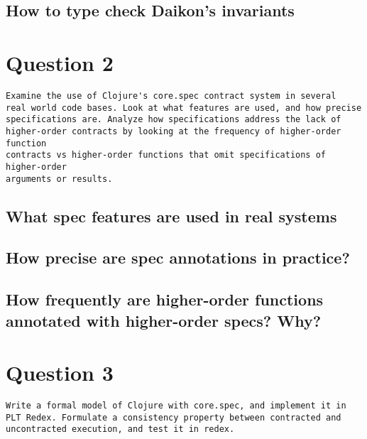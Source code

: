 \documentclass[10pt]{article}
\begin{document}
\subsection*{How to type check Daikon's invariants}


\section*{Question 2}

\begin{verbatim}
Examine the use of Clojure's core.spec contract system in several
real world code bases. Look at what features are used, and how precise
specifications are. Analyze how specifications address the lack of
higher-order contracts by looking at the frequency of higher-order function
contracts vs higher-order functions that omit specifications of higher-order
arguments or results.
\end{verbatim}

\subsection*{What spec features are used in real systems}

\subsection*{How precise are spec annotations in practice?}

\subsection*{How frequently are higher-order functions annotated with higher-order specs? Why?}

\section*{Question 3}

\begin{verbatim}
Write a formal model of Clojure with core.spec, and implement it in
PLT Redex. Formulate a consistency property between contracted and
uncontracted execution, and test it in redex.
\end{verbatim}
\end{document}
